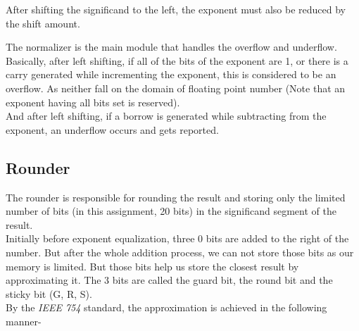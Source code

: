 \documentclass[14pt]{article}
\begin{document}
After shifting the significand to the left, the exponent must also be reduced by the shift amount.

The normalizer is the main module that handles the overflow and underflow. Basically, after left shifting, if all of the bits of the exponent are 1, or there is a carry generated while incrementing the exponent, this is considered to be an overflow. As neither fall on the domain of floating point number (Note that an exponent having all bits set is reserved).\\

And after left shifting, if a borrow is generated while subtracting from the exponent, an underflow occurs and gets reported.

\subsection{Rounder}
The rounder is responsible for rounding the result and storing only the limited number of bits (in this assignment, 20 bits) in the significand segment of the result.\\
Initially before exponent equalization, three 0 bits are added to the right of the number. But after the whole addition process, we can not store those bits as our memory is limited. But those bits help us store the closest result by approximating it. The 3 bits are called the guard bit, the round bit and the sticky bit (G, R, S).\\

By the \textit{IEEE 754} standard, the approximation is achieved in the following manner-\\
\end{document}
